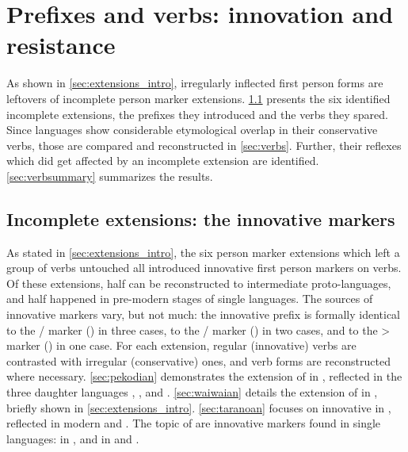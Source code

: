 \section{Prefixes and verbs: innovation and resistance}
\label{sec:data}
As shown in \cref{sec:extensions_intro}, irregularly inflected first person forms are leftovers of incomplete person marker extensions.
\cref{sec:extensions} presents the six identified incomplete extensions, the prefixes they introduced and the verbs they spared.
Since languages show considerable etymological overlap in their conservative verbs, those are compared and reconstructed in \cref{sec:verbs}.
Further, their reflexes which did get affected by an incomplete extension are identified.
\cref{sec:verbsummary} summarizes the results.

\subsection{Incomplete extensions: the innovative \texorpdfstring{}{Sa} markers}
\label{sec:extensions}
As stated in \cref{sec:extensions_intro}, the six person marker extensions which left a group of verbs untouched all introduced innovative first person markers on  verbs.
Of these extensions, half can be reconstructed to intermediate proto-languages, and half happened in pre-modern stages of single languages.
The sources of innovative markers vary, but not much: the innovative  prefix is formally identical to the / marker (\PC {}) in three cases, to the / marker (\PC {}) in two cases, and to the > marker (\PC {}) in one case.
For each extension, regular (innovative) verbs are contrasted with irregular (conservative) ones, and verb forms are reconstructed where necessary.
\cref{sec:pekodian} demonstrates the extension of  in \PPek, reflected in the three daughter languages \arara, \ikpeng, and \bakairi.
\cref{sec:waiwaian} details the extension of  in \PWai, briefly shown in \cref{sec:extensions_intro}.
\cref{sec:taranoan} focuses on innovative  in \PTir, reflected in modern \trio and \akuriyo.
The topic of  are innovative  markers found in single languages:
 in \akuriyo, and  in \carijo and \yukpa.
 
